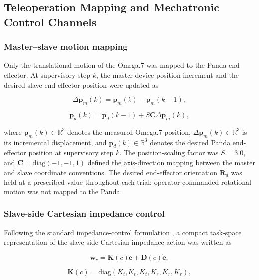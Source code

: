 \subsection{Teleoperation Mapping and Mechatronic Control Channels}
\subsubsection{Master--slave motion mapping}
Only the translational motion of the Omega.7 was mapped to the Panda end effector. At supervisory step $k$, the master-device position increment and the desired slave end-effector position were updated as

\begin{equation}
\label{eq:master-position-increment}
\Delta\mathbf{p}_m(k)=\mathbf{p}_m(k)-\mathbf{p}_m(k-1),
\end{equation}

\begin{equation}
\label{eq:desired-slave-position}
\mathbf{p}_d(k)=\mathbf{p}_d(k-1)+S\mathbf{C}\Delta\mathbf{p}_m(k),
\end{equation}

where $\mathbf{p}_m(k)\in\mathbb{R}^3$ denotes the measured Omega.7 position, $\Delta\mathbf{p}_m(k)\in\mathbb{R}^3$ is its incremental displacement, and $\mathbf{p}_d(k)\in\mathbb{R}^3$ denotes the desired Panda end-effector position at supervisory step $k$. The position-scaling factor was $S=3.0$, and $\mathbf{C}=\mathrm{diag}(-1,-1,1)$ defined the axis-direction mapping between the master and slave coordinate conventions. The desired end-effector orientation $\mathbf{R}_d$ was held at a prescribed value throughout each trial; operator-commanded rotational motion was not mapped to the Panda.

\subsubsection{Slave-side Cartesian impedance control}
Following the standard impedance-control formulation \cite{ref03}, a compact task-space representation of the slave-side Cartesian impedance action was written as

\begin{equation}
\label{eq:cartesian-impedance}
\mathbf{w}_c=\mathbf{K}(c)\mathbf{e}+\mathbf{D}(c)\dot{\mathbf{e}},
\end{equation}

\begin{equation}
\label{eq:stiffness-matrix}
\mathbf{K}(c)=\mathrm{diag}(K_t,K_t,K_t,K_r,K_r,K_r),
\end{equation}

